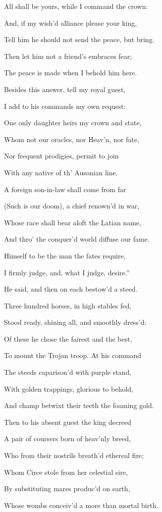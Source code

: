 All shall be yours, while I command the crown:

And, if my wish’d alliance please your king,

Tell him he should not send the peace, but bring.

Then let him not a friend’s embraces fear;

The peace is made when I behold him here.

Besides this answer, tell my royal guest,

I add to his commands my own request:

One only daughter heirs my crown and state,

Whom not our oracles, nor Heav’n, nor fate,

Nor frequent prodigies, permit to join

With any native of th’ Ausonian line.

A foreign son-in-law shall come from far

(Such is our doom), a chief renown’d in war,

Whose race shall bear aloft the Latian name,

And thro’ the conquer’d world diffuse our fame.

Himself to be the man the fates require,

I firmly judge, and, what I judge, desire.”

He said, and then on each bestow’d a steed.

Three hundred horses, in high stables fed,

Stood ready, shining all, and smoothly dress’d:

Of these he chose the fairest and the best,

To mount the Trojan troop. At his command

The steeds caparison’d with purple stand,

With golden trappings, glorious to behold,

And champ betwixt their teeth the foaming gold.

Then to his absent guest the king decreed

A pair of coursers born of heav’nly breed,

Who from their nostrils breath’d ethereal fire;

Whom Circe stole from her celestial sire,

By substituting mares produc’d on earth,

Whose wombs conceiv’d a more than mortal birth.


